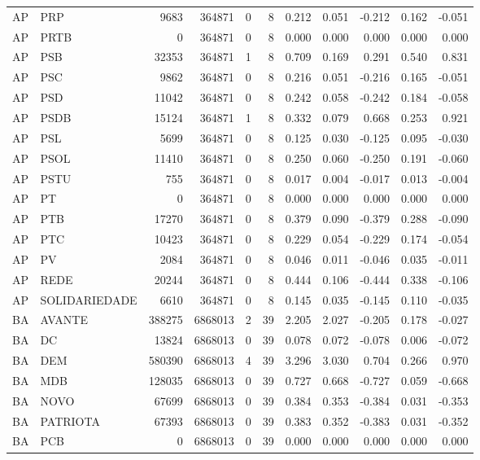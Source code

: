 \begin{landscape}
\begin{longtable}{llrrrrrrrrr}
AP & PRP & 9683 & 364871 & 0 & 8 & 0.212 & 0.051 & -0.212 & 0.162 & -0.051 \\
AP & PRTB & 0 & 364871 & 0 & 8 & 0.000 & 0.000 & 0.000 & 0.000 & 0.000 \\
AP & PSB & 32353 & 364871 & 1 & 8 & 0.709 & 0.169 & 0.291 & 0.540 & 0.831 \\
AP & PSC & 9862 & 364871 & 0 & 8 & 0.216 & 0.051 & -0.216 & 0.165 & -0.051 \\
AP & PSD & 11042 & 364871 & 0 & 8 & 0.242 & 0.058 & -0.242 & 0.184 & -0.058 \\
AP & PSDB & 15124 & 364871 & 1 & 8 & 0.332 & 0.079 & 0.668 & 0.253 & 0.921 \\
AP & PSL & 5699 & 364871 & 0 & 8 & 0.125 & 0.030 & -0.125 & 0.095 & -0.030 \\
AP & PSOL & 11410 & 364871 & 0 & 8 & 0.250 & 0.060 & -0.250 & 0.191 & -0.060 \\
AP & PSTU & 755 & 364871 & 0 & 8 & 0.017 & 0.004 & -0.017 & 0.013 & -0.004 \\
AP & PT & 0 & 364871 & 0 & 8 & 0.000 & 0.000 & 0.000 & 0.000 & 0.000 \\
AP & PTB & 17270 & 364871 & 0 & 8 & 0.379 & 0.090 & -0.379 & 0.288 & -0.090 \\
AP & PTC & 10423 & 364871 & 0 & 8 & 0.229 & 0.054 & -0.229 & 0.174 & -0.054 \\
AP & PV & 2084 & 364871 & 0 & 8 & 0.046 & 0.011 & -0.046 & 0.035 & -0.011 \\
AP & REDE & 20244 & 364871 & 0 & 8 & 0.444 & 0.106 & -0.444 & 0.338 & -0.106 \\
AP & SOLIDARIEDADE & 6610 & 364871 & 0 & 8 & 0.145 & 0.035 & -0.145 & 0.110 & -0.035 \\
BA & AVANTE & 388275 & 6868013 & 2 & 39 & 2.205 & 2.027 & -0.205 & 0.178 & -0.027 \\
BA & DC & 13824 & 6868013 & 0 & 39 & 0.078 & 0.072 & -0.078 & 0.006 & -0.072 \\
BA & DEM & 580390 & 6868013 & 4 & 39 & 3.296 & 3.030 & 0.704 & 0.266 & 0.970 \\
BA & MDB & 128035 & 6868013 & 0 & 39 & 0.727 & 0.668 & -0.727 & 0.059 & -0.668 \\
BA & NOVO & 67699 & 6868013 & 0 & 39 & 0.384 & 0.353 & -0.384 & 0.031 & -0.353 \\
BA & PATRIOTA & 67393 & 6868013 & 0 & 39 & 0.383 & 0.352 & -0.383 & 0.031 & -0.352 \\
BA & PCB & 0 & 6868013 & 0 & 39 & 0.000 & 0.000 & 0.000 & 0.000 & 0.000 \\

\end{longtable}
\end{landscape}
